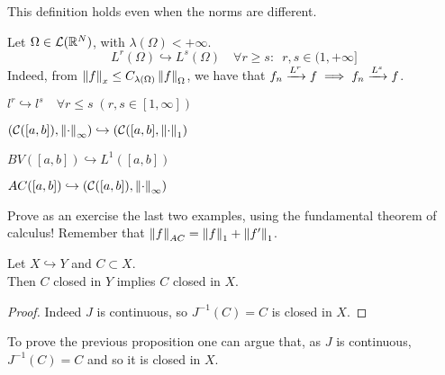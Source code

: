 This definition holds even when the norms are different.

\begin{exam}
	Let $\Omega \in \mathcal L(\mathbb R^N)$, with $\lambda(\Omega)<+\infty$.
		$$L^r(\Omega) \hookrightarrow L^s(\Omega) \quad \forall r \geq s : \enspace r,s \in (1,+\infty]$$
		Indeed, from $\left\lVert f\right\rVert_x \leq C_{\lambda(\Omega)}\left\lVert f\right\rVert_\Omega$, we have that $f_n \xrightarrow{L^{r}} f \implies f_n \xrightarrow{L^{s}} f$.
\end{exam}
\begin{exam}
	 $l^r \hookrightarrow l^s \quad \forall r \leq s \; (r,s \in [1,\infty])$
\end{exam}
\begin{exam}
	$(\mathcal C([a,b]), \left\lVert\cdot\right\rVert_\infty) \hookrightarrow(\mathcal C([a,b],\left\lVert\cdot\right\rVert_1)$
\end{exam}
\begin{exam}
	$BV([a,b])\hookrightarrow L^1([a,b])$
\end{exam}
\begin{exam}
	$AC([a,b]) \hookrightarrow (\mathcal C([a,b]),\left\lVert\cdot\right\rVert_\infty)$
\end{exam}
Prove as an exercise the last two examples, using the fundamental theorem of calculus! Remember that $\left\lVert f\right\rVert_{AC} = \left\lVert f\right\rVert_1 + \left\lVert f'\right\rVert_1$.

\begin{prop}
	Let $X\hookrightarrow Y$ and $C \subset X$. \\
	Then $C$ closed in $Y$ implies $C$ closed in $X$.
\end{prop}

\begin{proof}
	Indeed $J$ is continuous, so $J^{-1}(C)=C$ is closed in $X$.
\end{proof}
To prove the previous proposition one can argue that, as $J$ is continuous, $J^{-1}(C)=C$ and so it is closed in $X$.